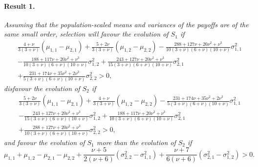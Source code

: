 \documentclass[11pt]{article}
\begin{document}
\paragraph{Result 1.}
\textit{
Assuming that the population-scaled means and variances of the payoffs are of the same small order, selection will favour the evolution of $S_1$ if
\begin{align}\label{sec1-case5-eq5}
&\frac{4+\nu}{3(3+\nu)}(\mu_{1,1}-\mu_{2,1})
+\frac{5+2\nu}{3(3+\nu)}(\mu_{1,2}-\mu_{2,2})
-\frac{288+127\nu+ 20\nu^2 + \nu^3}{10(3+\nu)(6+\nu)(10+\nu)}\sigma^2_{1,1}\nonumber\\
&-\frac{188+117\nu+20\nu^2+\nu^3}{10(3+\nu)(6+\nu)(10+\nu)}\sigma^2_{1,2}
+\frac{243+127\nu+20\nu^2+\nu^3}{15(3+\nu)(6+\nu)(10+\nu)}\sigma^2_{2,1}\nonumber\\
&+\frac{231+174\nu+35\nu^2+2\nu^3}{5(3+\nu)(6+\nu)(10+\nu)}\sigma^2_{2,2}>0,
\end{align}
disfavour the evolution of $S_2$ if
\begin{align}\label{sec1-case5-eq6}
&\frac{5+2\nu}{3(3+\nu)}(\mu_{1,1}-\mu_{2,1})
+\frac{4+\nu}{3(3+\nu)}(\mu_{1,2}-\mu_{2,2})
-\frac{231+174\nu+35\nu^2+2\nu^3}{5(3+\nu)(6+\nu)(10+\nu)}\sigma^2_{1,1}\nonumber\\
&-\frac{243+127\nu+20\nu^2+\nu^3}{15(3+\nu)(6+\nu)(10+\nu)}\sigma^2_{1,2}
+\frac{188+117\nu+20\nu^2+\nu^3}{10(3+\nu)(6+\nu)(10+\nu)}\sigma^2_{2,1}\nonumber\\
&+\frac{288+127\nu+ 20\nu^2 + \nu^3}{10(3+\nu)(6+\nu)(10+\nu)}\sigma^2_{2,2}>0,
\end{align}
and favour the evolution of $S_1$ more than the evolution of $S_2$ if
\begin{equation}\label{sec1-case5-eq7}
\mu_{1,1}+\mu_{1,2}-\mu_{2,1}-\mu_{2,2}
+\frac{\nu+5}{2\left(\nu+6\right)}(\sigma^2_{2,2}-\sigma^2_{1,1})+\frac{\nu+7}{6\left(\nu+6\right)}(\sigma^2_{2,1}-\sigma^2_{1,2})
>0.
\end{equation}
}
\end{document}
